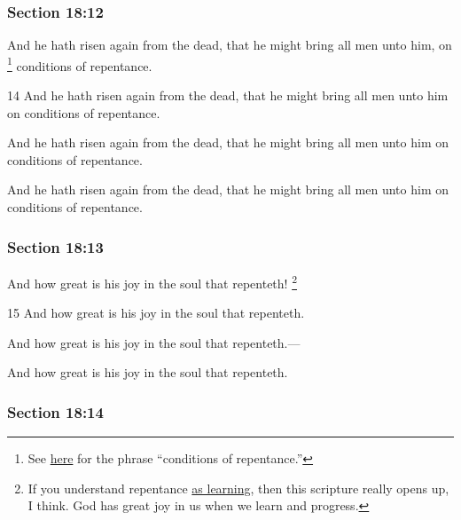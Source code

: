 	\subsubsection{Section 18:12} %
		\label{DC18-12}

		And he hath risen again from the dead, that he might bring all men unto him, on
			\footnote{%
				See \hyperref[CONDITION-PHRASES]{here} for the phrase ``conditions of repentance.''
				}%
		conditions of repentance.

		\begin{framed}
		\scriptsize
			\begin{compactdesc}
				\item[JSP] 14 And he hath risen again from the dead, that he might bring all men unto him on conditions of repentance.
				\item[DC 1835] And he hath risen again from the dead, that he might bring all men unto him on conditions of repentance. 
				\item[DC 1844] And he hath risen again from the dead, that he might bring all men unto him on conditions of repentance. 
			\end{compactdesc}
		\end{framed}

	\subsubsection{Section 18:13} %
		\label{DC18-13}

		And how great is his joy in the soul that repenteth!%
			\footnote{%
				If you understand repentance \hyperref[REPENTANCE-learning]{as learning}, then this scripture really opens up, I think. God has great joy in us when we learn and progress.
				}

		\begin{framed}
		\scriptsize
			\begin{compactdesc}
				\item[JSP] 15 And how great is his joy in the soul that repenteth.
				\item[DC 1835] And how great is his joy in the soul that repenteth.--- 
				\item[DC 1844] And how great is his joy in the soul that repenteth. 
			\end{compactdesc}
		\end{framed}

	\subsubsection{Section 18:14} %
		\label{DC18-14}

